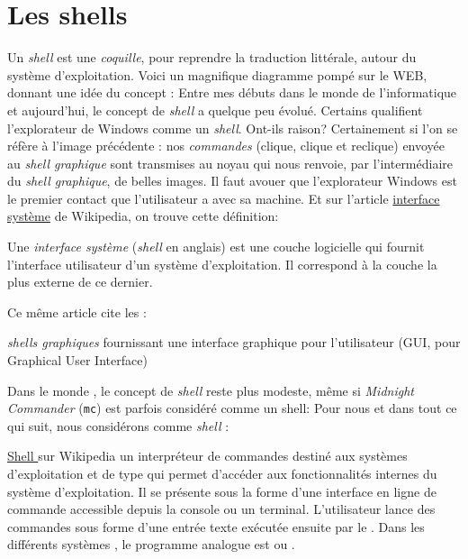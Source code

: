 
\section{Les shells}
Un \emph{shell} est une \emph{coquille}, pour reprendre la traduction littérale, autour du système d'exploitation. Voici un magnifique diagramme pompé sur le WEB, donnant une idée du concept :
Entre mes débuts dans le monde de l'informatique et aujourd'hui, le concept de \emph{shell} a quelque peu évolué. Certains qualifient l'explorateur de Windows comme un \emph{shell}. Ont-ils raison? Certainement si l'on se réfère à l'image précédente : nos \emph{commandes} (clique, clique et reclique) envoyée au \emph{shell graphique} sont transmises au noyau qui nous renvoie, par l'intermédiaire du \emph{shell graphique}, de belles images. Il faut avouer que l'explorateur Windows est le premier contact que l'utilisateur a avec sa machine.  Et sur l'article \href{http://fr.wikipedia.org/wiki/Interface_syst%C3%A8me}{interface système} de Wikipedia, on trouve cette définition:

\begin{Quote}
Une \emph{interface système }(\emph{shell} en anglais) est une couche logicielle qui fournit l'interface utilisateur d'un système d'exploitation. Il correspond à la couche la plus externe de ce dernier.
\end{Quote}

Ce même article cite les :
\begin{Quote}
\emph{shells graphiques} fournissant une interface graphique pour l'utilisateur (GUI, pour Graphical User Interface)
\end{Quote}

Dans le monde \unix, le concept de \emph{shell} reste plus modeste, même si \emph{Midnight Commander} (\texttt{mc}) est parfois considéré comme un shell:
Pour nous et dans tout ce qui suit, nous considérons comme \emph{shell} :

\begin{Quotebis}{\href{http://fr.wikipedia.org/wiki/Shell_Unix}{Shell \unix} sur Wikipedia}
un interpréteur de commandes destiné aux systèmes d'exploitation \unix et de type \unix qui permet d'accéder aux fonctionnalités internes du système d'exploitation. Il se présente sous la forme d'une interface en ligne de commande accessible depuis la console ou un terminal. L'utilisateur lance des commandes sous forme d'une entrée texte exécutée ensuite par le \shell. Dans les différents systèmes \windows, le programme analogue est  ou .
\end{Quotebis}

